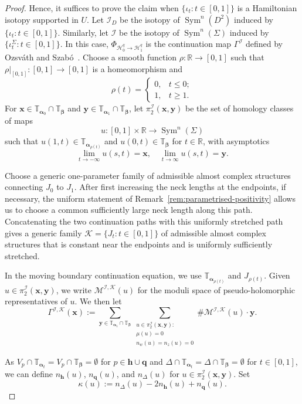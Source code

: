 \documentclass[11pt]{amsart}
\numberwithin{equation}{section}
\numberwithin{figure}{section}
\theoremstyle{definition}
\newcommand{\cH}{\mathcal{H}}
\newcommand{\cK}{\mathscr{K}}
\newcommand{\cM}{\mathcal{M}}
\newcommand{\bR}{\mathbb{R}}
\newcommand{\bT}{\mathbb{T}}
\newcommand{\sI}{\mathscr{I}}
\DeclareMathOperator{\Sym}{Sym}
\newcommand{\as}{\boldsymbol{\alpha}}
\newcommand{\bs}{\boldsymbol{\beta}}
\newcommand{\hs}{\boldsymbol{h}}
\newcommand{\qs}{\boldsymbol{q}}
\newcommand{\xs}{\boldsymbol{x}}
\newcommand{\ys}{\boldsymbol{y}}
\begin{document}
\begin{proof}
    Hence, it suffices to prove the claim when $\{\iota_t : t \in [0,1]\}$ is a Hamiltonian isotopy supported in $U$. Let $\sI_D$ be the isotopy of $\Sym^n(D^2)$ induced by $\{\iota_t : t \in [0,1]\}$. Similarly, let $\sI$ be the isotopy of $\Sym^n(\Sigma)$ induced by $\{\iota_t^\Sigma : t \in [0,1]\}$. In this case, $\Phi_{\cH^q_0 \to \cH^q_1}$ is the continuation map $\Gamma^{\sI}$ defined by Ozsv\'ath and Szab\'o~\cite[p.~54]{OS}. Choose a smooth function $\rho \colon \bR \to [0,1]$ such that $\rho|_{[0,1]} \colon [0,1] \to [0,1]$ is a homeomorphism and 
    \[
    \rho(t) = 
    \begin{cases}
        0, & t \le 0; \\
        1, & t \ge 1.
    \end{cases}
    \] 
    For $\xs \in \bT_{\as_0} \cap \bT_{\bs}$ and $\ys \in \bT_{\as_1} \cap \bT_{\bs}$, let $\pi_2^\sI(\xs,\ys)$ be the set of homology classes of maps 
    \[
    u \colon [0,1] \times \bR \to \Sym^n(\Sigma) 
    \]
    such that $u(1,t) \in \bT_{\as_{\rho(t)}}$ and $u(0,t) \in \bT_{\bs}$ for $t \in \bR$, with asymptotics 
    \[
    \lim_{t \to -\infty} u(s,t) = \xs, \quad \lim_{t \to \infty} u(s,t) = \ys.
    \]

    Choose a generic one-parameter family of admissible almost complex structures connecting $J_0$ to $J_1$. After first increasing the neck lengths at the endpoints, if necessary, the uniform statement of Remark~\ref{rem:parametrised-positivity} allows us to choose a common sufficiently large neck length along this path. Concatenating the two continuation paths with this uniformly stretched path gives a generic family $\cK = \{J_t : t \in [0,1]\}$ of admissible almost complex structures that is constant near the endpoints and is uniformly sufficiently stretched.
    
    In the moving boundary continuation equation, we use $\bT_{\as_{\rho(t)}}$ and $J_{\rho(t)}$. Given $u \in \pi_2^{\sI}(\xs,\ys)$, we write $\cM^{\sI, \cK}(u)$ for the moduli space of pseudo-holomorphic representatives of $u$. We then let
    \[
    \Gamma^{\sI, \cK}(\xs) := \sum_{\ys \in \bT_{\as_1} \cap \bT_{\bs}} \sum_{\substack{u \in \pi_2^{\sI}(\xs,\ys): \\ \mu(u) = 0\\ n_w(u) = n_z(u) = 0}} \#\cM^{\sI, \cK}(u) \cdot \ys.
    \]

    As $V_p \cap \bT_{\as_t} = V_p \cap \bT_{\bs} = \emptyset$ for $p \in \hs \cup \qs$ and $\Delta \cap \bT_{\as_t} = \Delta \cap \bT_{\bs} = \emptyset$ for $t \in [0,1]$, we can define $n_{\hs}(u)$, $n_{\qs}(u)$, and $n_{\Delta}(u)$ for $u \in \pi_2^{\sI}(\xs,\ys)$. Set
    \[
    \kappa(u) := n_\Delta(u) - 2n_{\hs}(u) + n_{\qs}(u).
    \]


\end{proof}
\end{document}
